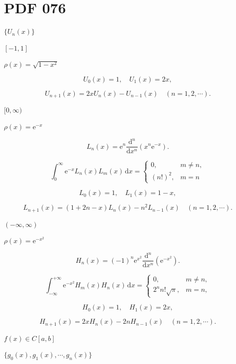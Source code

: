\documentclass[UTF8,fontset=fandol,a4paper]{ctexart}
\begin{document}
\section*{PDF 076}

\noindent $\{U_n(x)\}$\par

\noindent $[-1,1]$\par

\noindent $\rho(x)=\sqrt{1-x^2}$\par

\[
U_0(x)=1,\quad U_1(x)=2x,
\]

\[
U_{n+1}(x)=2xU_n(x)-U_{n-1}(x)\quad(n=1,2,\cdots).
\]

\noindent $[0,\infty)$\par

\noindent $\rho(x)=\mathrm e^{-x}$\par

\[
L_n(x)=\mathrm e^n\frac{\mathrm d^n}{\mathrm dx^n}(x^n\mathrm e^{-x}).\tag{3.4.11}
\]

\[
\int_0^\infty \mathrm e^{-x}L_n(x)L_m(x)\,\mathrm dx=
\begin{cases}
0,&m\ne n,\\
(n!)^2,&m=n
\end{cases}
\]

\[
L_0(x)=1,\quad L_1(x)=1-x,
\]

\[
L_{n+1}(x)=(1+2n-x)L_n(x)-n^2L_{n-1}(x)\quad(n=1,2,\cdots).
\]

\noindent $(-\infty,\infty)$\par

\noindent $\rho(x)=\mathrm e^{-x^2}$\par

\[
H_n(x)=(-1)^n\mathrm e^{x^2}\frac{\mathrm d^n}{\mathrm dx^n}(\mathrm e^{-x^2}).\tag{3.4.12}
\]

\[
\int_{-\infty}^{+\infty}\mathrm e^{-x^2}H_m(x)H_n(x)\,\mathrm dx=
\begin{cases}
0,&m\ne n,\\
2^nn!\sqrt\pi,&m=n,
\end{cases}
\]

\[
H_0(x)=1,\quad H_1(x)=2x,
\]

\[
H_{n+1}(x)=2xH_n(x)-2nH_{n-1}(x)\quad(n=1,2,\cdots).
\]

\noindent $f(x)\in C[a,b]$\par

\noindent $\{g_0(x),g_1(x),\cdots,g_n(x)\}$\par
\end{document}
